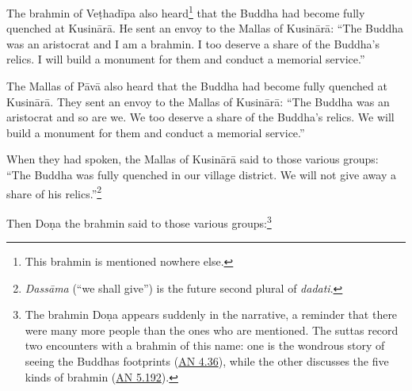 \documentclass[12pt,openany]{book}%
\begin{document}
The brahmin of \textsanskrit{Veṭhadīpa} also heard\footnote{This brahmin is mentioned nowhere else. } that the Buddha had become fully quenched at \textsanskrit{Kusinārā}. He sent an envoy to the Mallas of \textsanskrit{Kusinārā}: “The Buddha was an aristocrat and I am a brahmin. I too deserve a share of the Buddha’s relics. I will build a monument for them and conduct a memorial service.” 

The Mallas of \textsanskrit{Pāvā} also heard that the Buddha had become fully quenched at \textsanskrit{Kusinārā}. They sent an envoy to the Mallas of \textsanskrit{Kusinārā}: “The Buddha was an aristocrat and so are we. We too deserve a share of the Buddha’s relics. We will build a monument for them and conduct a memorial service.” 

When they had spoken, the Mallas of \textsanskrit{Kusinārā} said to those various groups: “The Buddha was fully quenched in our village district. We will not give away a share of his relics.”\footnote{\textit{\textsanskrit{Dassāma}} (“we shall give”) is the future second plural of \textit{dadati}. } 

Then \textsanskrit{Doṇa} the brahmin said to those various groups:\footnote{The brahmin \textsanskrit{Doṇa} appears suddenly in the narrative, a reminder that there were many more people than the ones who are mentioned. The suttas record two encounters with a brahmin of this name: one is the wondrous story of seeing the Buddhas footprints (\href{https://suttacentral.net/an4.36/en/sujato}{AN 4.36}), while the other discusses the five kinds of brahmin (\href{https://suttacentral.net/an5.192/en/sujato}{AN 5.192}). } 
\end{document}
